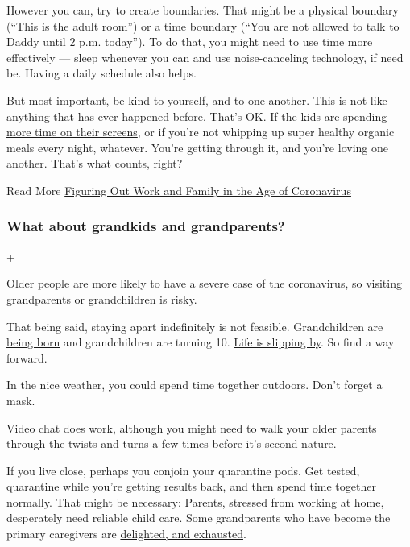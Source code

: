 However you can, try to create boundaries. That might be a physical
boundary (``This is the adult room'') or a time boundary (``You are not
allowed to talk to Daddy until 2 p.m. today''). To do that, you might
need to use time more effectively --- sleep whenever you can and use
noise-canceling technology, if need be. Having a daily schedule also
helps.

But most important, be kind to yourself, and to one another. This is not
like anything that has ever happened before. That's OK. If the kids are
\href{https://www.nytimes.com/2020/04/13/parenting/manage-screen-time-coronavirus.html}{spending
more time on their screens}, or if you're not whipping up super healthy
organic meals every night, whatever. You're getting through it, and
you're loving one another. That's what counts, right?

 Read More
\href{https://www.nytimes.com/2020/03/19/us/work-from-home-mothers-coronavirus-covid19.html}{Figuring
Out Work and Family in the Age of Coronavirus}

\hypertarget{what-about-grandkids-and-grandparents}{%
\subsubsection{What about grandkids and
grandparents?}\label{what-about-grandkids-and-grandparents}}

+

Older people are more likely to have a severe case of the coronavirus,
so visiting grandparents or grandchildren is
\href{https://www.nytimes.com/2020/03/20/parenting/grandparents-visit-safety-coronavirus.html}{risky}.

That being said, staying apart indefinitely is not feasible.
Grandchildren are
\href{https://www.nytimes.com/2020/06/16/parenting/baby/grandparents-meet-newborn-coronavirus.html}{being
born} and grandchildren are turning 10.
\href{https://www.nytimes.com/2020/04/29/well/family/coronavirus-grandchildren-compromised-immunity-cancer.html}{Life
is slipping by}. So find a way forward.

In the nice weather, you could spend time together outdoors. Don't
forget a mask.

Video chat does work, although you might need to walk your older parents
through the twists and turns a few times before it's second nature.

If you live close, perhaps you conjoin your quarantine pods. Get tested,
quarantine while you're getting results back, and then spend time
together normally. That might be necessary: Parents, stressed from
working at home, desperately need reliable child care. Some grandparents
who have become the primary caregivers are
\href{https://www.nytimes.com/2020/05/12/parenting/coronavirus-grandparents-childcare.html?type=roundup\&link=intro}{delighted,
and exhausted}.

